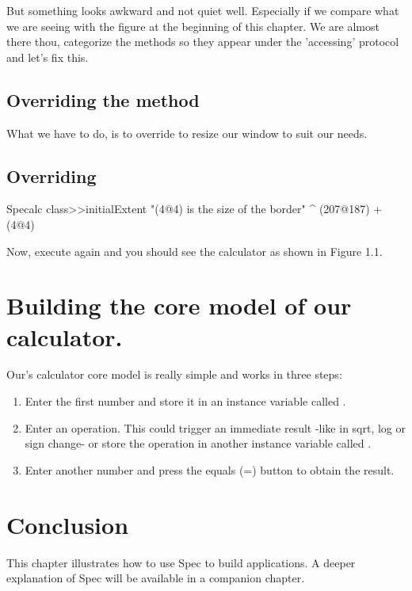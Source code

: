 \documentclass[a4paper,10pt,twoside]{book}
\begin{document}
But something looks awkward and not quiet well. Especially if we compare what we are seeing with the figure at the beginning of this chapter. We are almost there thou, categorize the methods so they appear under the 'accessing' protocol and let's fix this.
\subsection{ Overriding the  method}
What we have to do, is to override  to resize our window to suit our needs. 
\subsection{Overriding }

\begin{code}{}
Specalc class>>initialExtent
	"(4@4) is the size of the border"
	^ (207@187) + (4@4)
\end{code}

Now, execute again  and you should see the calculator as shown in Figure 1.1.
\section{ Building the core model of our calculator.}
Our's calculator core model is really simple and works in three steps:

\begin{enumerate}
\item Enter the first number and store it in an instance variable called .
\item Enter an operation. This could trigger an immediate result -like in sqrt, log or sign change- or store the operation in another instance variable called .
\item Enter another number and press the equals (=) button to obtain the result.
\end{enumerate}
\section{ Conclusion}
This chapter illustrates how to use Spec to build applications. A deeper explanation of Spec will be available in a companion chapter.



\ifx\wholebook\relax\else
   
\end{document}
